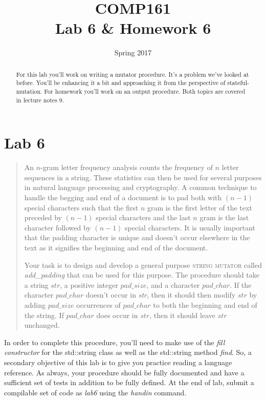 \documentclass[nobib]{tufte-handout}
\title{COMP161 \\ Lab 6 \& Homework 6}
\author{}
\date{Spring 2017}
\begin{document}
\maketitle

\begin{abstract}
For this lab you'll work on writing a mutator procedure. It's a problem we've looked at before. You'll be enhancing it a bit and approaching it from the perspective of stateful-mutation. For homework you'll work on an output procedure. Both topics are covered in lecture notes 9.
\end{abstract}

\section{Lab 6}

\begin{framed}
\begin{quote}
An $n$-gram letter frequency analysis counts the frequency of $n$ letter sequences in a string. These statistics can then be used for several purposes in natural language processing and cryptography. A common technique to handle the begging and end of a document is to pad both with $(n-1)$ special characters such that the first $n$ gram is the first letter of the text preceded by $(n-1)	$ special characters and the last $n$ gram is the last character followed by $(n-1)$ special characters. It is usually important that the padding character is unique and doesn't occur elsewhere in the text as it signifies the beginning and end of the document.

Your task is to design and develop a general purpose \textsc{string mutator} called \textit{add\_padding} that can be used for this purpose. The procedure should take a string $str$, a positive integer $pad\_size$, and a character $pad\_char$. If the character $pad\_char$ doesn't occur in \textit{str}, then it should then modify $str$ by adding  $pad\_size$ occurrences of $pad\_char$ to both the beginning and end of the string. If $pad\_char$ does occur in $str$, then it should leave $str$ unchanged.
\end{quote}
\end{framed}

In order to complete this procedure, you'll need to make use of the \textit{fill constructor} for the std::string class as well as the std::string method \textit{find}.  So, a secondary objective of this lab is to give you practice reading a language reference.  As always, your procedure should be fully documented and have a sufficient set of tests in addition to be fully defined. At the end of lab, submit a compilable set of code as \textit{lab6} using the \textit{handin} command.
\end{document}
